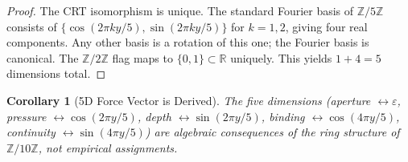 \documentclass{amsart}
\newtheorem{corollary}[theorem]{Corollary}
\begin{document}
\begin{proof}
The CRT isomorphism is unique. The standard Fourier basis of $\mathbb{Z}/5\mathbb{Z}$
consists of $\{\cos(2\pi k y/5), \sin(2\pi k y/5)\}$ for $k=1,2$, giving four real
components. Any other basis is a rotation of this one; the Fourier basis is canonical.
The $\mathbb{Z}/2\mathbb{Z}$ flag maps to $\{0,1\} \subset \mathbb{R}$ uniquely.
This yields $1+4=5$ dimensions total.
\end{proof}

\begin{corollary}[5D Force Vector is Derived]
The five dimensions (aperture $\leftrightarrow \varepsilon$,
pressure $\leftrightarrow \cos(2\pi y/5)$,
depth $\leftrightarrow \sin(2\pi y/5)$,
binding $\leftrightarrow \cos(4\pi y/5)$,
continuity $\leftrightarrow \sin(4\pi y/5)$)
are algebraic consequences of the ring structure of $\mathbb{Z}/10\mathbb{Z}$,
not empirical assignments.
\end{corollary}
\end{document}
